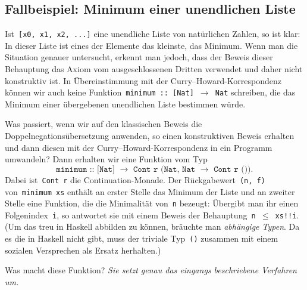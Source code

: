 \documentclass[a4paper,ngerman,10pt]{scrartcl}
\theoremstyle{plain}
\begin{document}
\subsection*{Fallbeispiel: Minimum einer unendlichen Liste}

Ist~\texttt{[x0, x1, x2, ...]} eine unendliche Liste von natürlichen Zahlen, so
ist klar: In dieser Liste ist eines der Elemente das kleinste, das Minimum. Wenn man
die Situation genauer untersucht, erkennt man jedoch, dass der Beweis dieser
Behauptung das Axiom vom ausgeschlossenen Dritten verwendet und daher nicht
konstruktiv ist. In Übereinstimmung mit der Curry--Howard-Korrespondenz können
wir auch keine Funktion~\texttt{minimum :: [Nat] $\to$ Nat} schreiben, die das
Minimum einer übergebenen unendlichen Liste bestimmen würde.

Was passiert, wenn wir auf den klassischen Beweis die
Doppelnegationsübersetzung anwenden, so einen konstruktiven Beweis erhalten und
dann diesen mit der Curry--Howard-Korrespondenz in ein Programm umwandeln? Dann
erhalten wir eine Funktion vom Typ \[\texttt{minimum :: [Nat] $\to$ Cont r (Nat,
Nat $\to$ Cont r ())}.\] Dabei ist~\texttt{Cont r} die Con\-ti\-nuation-Monade. Der
Rückgabewert~\texttt{(n, f)} von~\texttt{minimum xs} enthält an erster Stelle
das Minimum der Liste und an zweiter Stelle eine Funktion, die die Minimalität
von~\texttt{n} bezeugt: Übergibt man ihr einen Folgenindex~\texttt{i}, so
antwortet sie mit einem Beweis der Behauptung~\texttt{n $\leq$ xs!!i}. (Um das
treu in Haskell abbilden zu können, bräuchte man \emph{abhängige Typen}. Da es
die in Haskell nicht gibt, muss der triviale Typ~\texttt{()} zusammen mit einem
sozialen Versprechen als Ersatz herhalten.)

Was macht diese Funktion? \emph{Sie setzt genau das eingangs beschriebene
Verfahren um.}

\renewcommand{\thefootnotemark}{}
\end{document}
